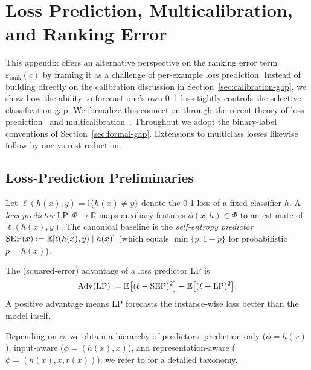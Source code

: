 \section{Loss Prediction, Multicalibration, and Ranking Error}
\label{app:loss-pred}

This appendix offers an alternative perspective on the ranking error term \(\varepsilon_{\text{rank}}(c)\) by framing it as a challenge of per-example loss prediction. Instead of building directly on the calibration discussion in Section~\ref{sec:calibration-gap}, we show how the ability to forecast one’s own 0--1 loss tightly controls the selective-classification gap. We formalize this connection through the recent theory of loss prediction~\citep{gollakota2025loss} and multicalibration~\citep{hebert2018multicalibration}. Throughout we adopt the binary-label conventions of Section~\ref{sec:formal-gap}. Extensions to multiclass losses likewise follow by one-vs-rest reduction.

\subsection{Loss‑Prediction Preliminaries}
\label{sec:loss_pred_prel}

Let \(\ell(h(x),y)=\mathbb{I}\{h(x)\neq y\}\) denote the 0-1 loss of a
fixed classifier \(h\).  A \emph{loss predictor}
\(\mathrm{LP}\colon\Phi\to\mathbb{R}\) maps auxiliary features
\(\phi(x,h)\in\Phi\) to an estimate of \(\ell(h(x),y)\).
The canonical baseline is the \emph{self‑entropy predictor}
\(\mathrm{SEP}(x):=\mathbb{E}[\ell(h(x),y)\mid h(x)]\)   %
(which equals \(\min\{p,1-p\}\) for probabilistic \(p=h(x)\)).

\begin{definition}
\label{def:advantage}
The (squared‑error) advantage of a loss predictor \(\mathrm{LP}\) is
\begin{equation}
\mathrm{Adv}(\mathrm{LP})
:=\mathbb{E}\bigl[(\ell-\mathrm{SEP})^{2}\bigr]
  -\mathbb{E}\bigl[(\ell-\mathrm{LP})^{2}\bigr].
\end{equation}
A positive advantage means \(\mathrm{LP}\) forecasts the
instance‑wise loss better than the model itself.
\end{definition}

Depending on \(\phi\), we obtain a hierarchy of predictors:
prediction‑only (\(\phi=h(x)\)), input‑aware (\(\phi=(h(x),x)\)),
and representation‑aware (\(\phi=(h(x),x,r(x))\)); we refer to
\citet{gollakota2025loss} for a detailed taxonomy.

